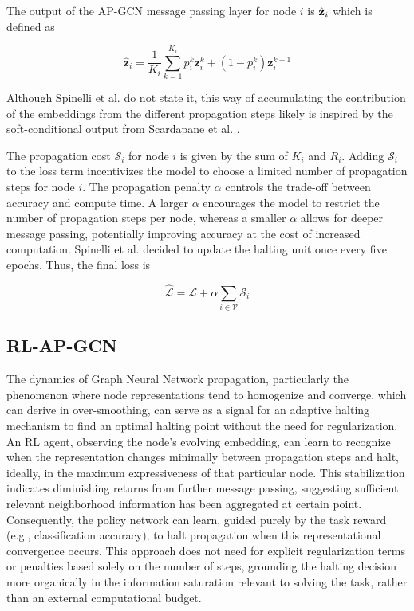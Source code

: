 \documentclass{gdl}
\begin{document}
The output of the AP-GCN message passing layer for node $i$ is $\hat{\bf{z}}_i$ which is defined as

$$ 
\hat{\mathbf{z}}_i = \frac{1}{K_i} \sum_{k=1}^{K_i} p_i^k \mathbf{z}^k_i + (1-p^k_i) \mathbf{z}_i^{k-1} 
$$

\noindent Although Spinelli et al. do not state it, this way of accumulating the contribution of the embeddings from the different propagation steps likely is inspired by the soft-conditional output from Scardapane et al. \cite{scardapane2020}.

 The propagation cost $\mathcal{S}_i$ for node $i$ is given by the sum of $K_i$ and $R_i$. Adding $\mathcal{S}_i$ to the loss term incentivizes the model to choose a limited number of propagation steps for node $i$. The propagation penalty $\alpha$ controls the trade-off between accuracy and compute time. A larger $\alpha$ encourages the model to restrict the number of propagation steps per node, whereas a smaller $\alpha$ allows for deeper message passing, potentially improving accuracy at the cost of increased computation. Spinelli et al. decided to update the halting unit once every five epochs. Thus, the final loss is

$$ \mathcal{\hat{L}} = \mathcal{L} + \alpha \sum_{i\in \mathcal{V}} \mathcal{S}_i $$


\subsection{RL-AP-GCN}
The dynamics of Graph Neural Network propagation, particularly the phenomenon where node representations tend to homogenize and converge, which can derive in over-smoothing, can serve as a signal for an adaptive halting mechanism to find an optimal halting point without the need for regularization. An RL agent, observing the node's evolving embedding, can learn to recognize when the representation changes minimally between propagation steps and halt, ideally, in the maximum expressiveness of that particular node. This stabilization indicates diminishing returns from further message passing, suggesting sufficient relevant neighborhood information has been aggregated at certain point. Consequently, the policy network can learn, guided purely by the task reward (e.g., classification accuracy), to halt propagation when this representational convergence occurs. This approach does not need for explicit regularization terms or penalties based solely on the number of steps, grounding the halting decision more organically in the information saturation relevant to solving the task, rather than an external computational budget.
\end{document}
